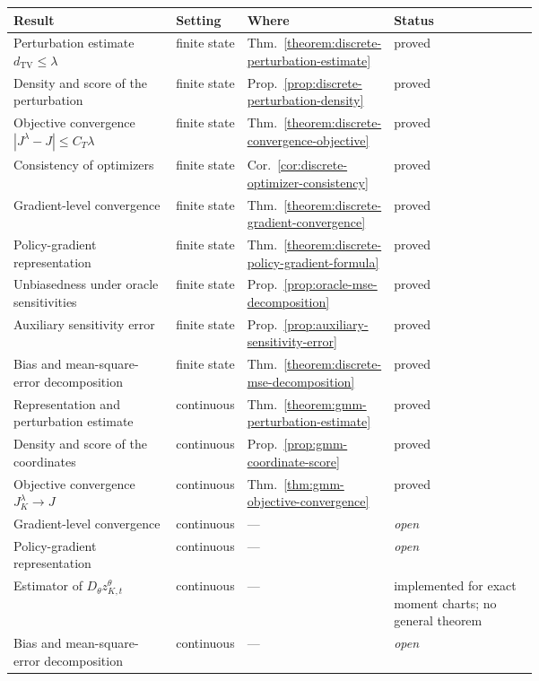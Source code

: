 \begin{table}[H]
\centering
\footnotesize
\setlength{\tabcolsep}{4.5pt}
\begin{tabular}{p{0.36\linewidth}llp{0.32\linewidth}}
\toprule
Result & Setting & Where & Status \\
\midrule
Perturbation estimate $d_{\mathrm{TV}}\leq\lambda$ & finite state & Thm.~\ref{theorem:discrete-perturbation-estimate} & proved \\
Density and score of the perturbation & finite state & Prop.~\ref{prop:discrete-perturbation-density} & proved \\
Objective convergence $|J^\lambda-J|\leq C_T\lambda$ & finite state & Thm.~\ref{theorem:discrete-convergence-objective} & proved \\
Consistency of optimizers & finite state & Cor.~\ref{cor:discrete-optimizer-consistency} & proved \\
Gradient-level convergence & finite state & Thm.~\ref{theorem:discrete-gradient-convergence} & proved \\
Policy-gradient representation & finite state & Thm.~\ref{theorem:discrete-policy-gradient-formula} & proved \\
Unbiasedness under oracle sensitivities & finite state & Prop.~\ref{prop:oracle-mse-decomposition} & proved \\
Auxiliary sensitivity error & finite state & Prop.~\ref{prop:auxiliary-sensitivity-error} & proved \\
Bias and mean-square-error decomposition & finite state & Thm.~\ref{theorem:discrete-mse-decomposition} & proved \\
\midrule
Representation and perturbation estimate & continuous & Thm.~\ref{theorem:gmm-perturbation-estimate} & proved \\
Density and score of the coordinates & continuous & Prop.~\ref{prop:gmm-coordinate-score} & proved \\
Objective convergence $J_K^\lambda\to J$ & continuous & Thm.~\ref{thm:gmm-objective-convergence} & proved \\
Gradient-level convergence & continuous & --- & \emph{open} \\
Policy-gradient representation & continuous & --- & \emph{open} \\
Estimator of $D_\theta z_{K,t}^\theta$ & continuous & --- & implemented for exact moment charts; no general theorem \\
Bias and mean-square-error decomposition & continuous & --- & \emph{open} \\

\end{tabular}
\end{table}
